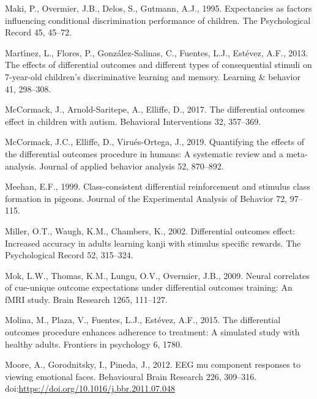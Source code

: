 \documentclass[]{elsarticle} %
\begin{document}
\leavevmode\hypertarget{ref-maki1995expectancies}{}%
Maki, P., Overmier, J.B., Delos, S., Gutmann, A.J., 1995. Expectancies
as factors influencing conditional discrimination performance of
children. The Psychological Record 45, 45--72.

\leavevmode\hypertarget{ref-martinez2013effects}{}%
Martı́nez, L., Flores, P., González-Salinas, C., Fuentes, L.J., Estévez,
A.F., 2013. The effects of differential outcomes and different types of
consequential stimuli on 7-year-old children's discriminative learning
and memory. Learning \& behavior 41, 298--308.

\leavevmode\hypertarget{ref-mccormack2017differential}{}%
McCormack, J., Arnold-Saritepe, A., Elliffe, D., 2017. The differential
outcomes effect in children with autism. Behavioral Interventions 32,
357--369.

\leavevmode\hypertarget{ref-mccormack2019quantifying}{}%
McCormack, J.C., Elliffe, D., Virués-Ortega, J., 2019. Quantifying the
effects of the differential outcomes procedure in humans: A systematic
review and a meta-analysis. Journal of applied behavior analysis 52,
870--892.

\leavevmode\hypertarget{ref-meehan1999class}{}%
Meehan, E.F., 1999. Class-consistent differential reinforcement and
stimulus class formation in pigeons. Journal of the Experimental
Analysis of Behavior 72, 97--115.

\leavevmode\hypertarget{ref-miller2002differential}{}%
Miller, O.T., Waugh, K.M., Chambers, K., 2002. Differential outcomes
effect: Increased accuracy in adults learning kanji with stimulus
specific rewards. The Psychological Record 52, 315--324.

\leavevmode\hypertarget{ref-mok2009neural}{}%
Mok, L.W., Thomas, K.M., Lungu, O.V., Overmier, J.B., 2009. Neural
correlates of cue-unique outcome expectations under differential
outcomes training: An fMRI study. Brain Research 1265, 111--127.

\leavevmode\hypertarget{ref-molina2015differential}{}%
Molina, M., Plaza, V., Fuentes, L.J., Estévez, A.F., 2015. The
differential outcomes procedure enhances adherence to treatment: A
simulated study with healthy adults. Frontiers in psychology 6, 1780.

\leavevmode\hypertarget{ref-MOORE2012309}{}%
Moore, A., Gorodnitsky, I., Pineda, J., 2012. EEG mu component responses
to viewing emotional faces. Behavioural Brain Research 226, 309--316.
doi:\href{https://doi.org/https://doi.org/10.1016/j.bbr.2011.07.048}{https://doi.org/10.1016/j.bbr.2011.07.048}
\end{document}
